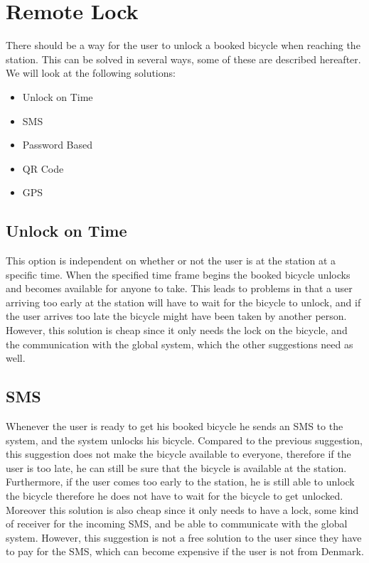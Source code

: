 \section{Remote Lock}\label{sec:remoteLock}
There should be a way for the user to unlock a booked bicycle when reaching the station.
This can be solved in several ways, some of these are described hereafter.
We will look at the following solutions:

\begin{itemize}
	\item Unlock on Time
	\item SMS
	\item Password Based
	\item QR Code
	\item GPS
\end{itemize}

\subsection{Unlock on Time}
This option is independent on whether or not the user is at the station at a specific time.
When the specified time frame begins the booked bicycle unlocks and becomes available for anyone to take.
This leads to problems in that a user arriving too early at the station will have to wait for the bicycle to unlock, and if the user arrives too late the bicycle might have been taken by another person.
However, this solution is cheap since it only needs the lock on the bicycle, and the communication with the global system, which the other suggestions need as well.

\subsection{SMS}
Whenever the user is ready to get his booked bicycle he sends an SMS to the system, and the system unlocks his bicycle.
Compared to the previous suggestion, this suggestion does not make the bicycle available to everyone, therefore if the user is too late, he can still be sure that the bicycle is available at the station.
Furthermore, if the user comes too early to the station, he is still able to unlock the bicycle therefore he does not have to wait for the bicycle to get unlocked.
Moreover this solution is also cheap since it only needs to have a lock, some kind of receiver for the incoming SMS, and be able to communicate with the global system.
However, this suggestion is not a free solution to the user since they have to pay for the SMS, which can become expensive if the user is not from Denmark.

